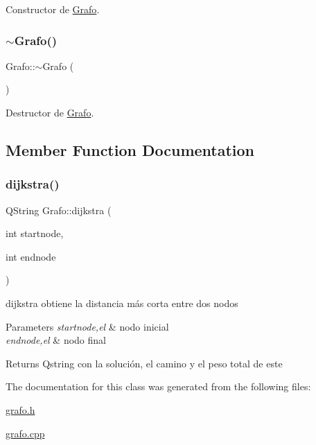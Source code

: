 Constructor de \hyperlink{class_grafo}{Grafo}. 

\mbox{\label{class_grafo_a16f3fbba0de2667dfba3b657cb7e95ff}} 
\subsubsection{\texorpdfstring{$\sim$\+Grafo()}{~Grafo()}}
{\footnotesize\ttfamily Grafo\+::$\sim$\+Grafo (\begin{DoxyParamCaption}{ }\end{DoxyParamCaption})}



Destructor de \hyperlink{class_grafo}{Grafo}. 



\subsection{Member Function Documentation}
\mbox{\label{class_grafo_a8fe931a9a154866add1bf763dcb88c12}} 
\subsubsection{\texorpdfstring{dijkstra()}{dijkstra()}}
{\footnotesize\ttfamily Q\+String Grafo\+::dijkstra (\begin{DoxyParamCaption}\item[{int}]{startnode,  }\item[{int}]{endnode }\end{DoxyParamCaption})}



dijkstra obtiene la distancia más corta entre dos nodos 


\begin{DoxyParams}{Parameters}
{\em startnode,el} & nodo inicial \\
\hline
{\em endnode,el} & nodo final \\
\hline
\end{DoxyParams}
\begin{DoxyReturn}{Returns}
Qstring con la solución, el camino y el peso total de este 
\end{DoxyReturn}


The documentation for this class was generated from the following files\+:\begin{DoxyCompactItemize}
\item 
\hyperlink{grafo_8h}{grafo.\+h}\item 
\hyperlink{grafo_8cpp}{grafo.\+cpp}\end{DoxyCompactItemize}
